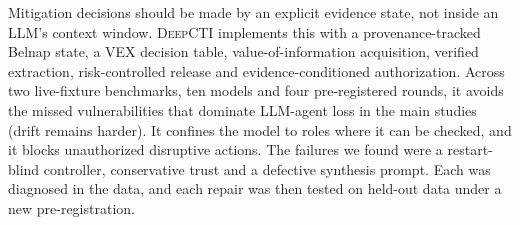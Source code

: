 \documentclass[conference]{IEEEtran}
\newcommand{\DC}{\textsc{DeepCTI}}
\begin{document}
Mitigation decisions should be made by an explicit evidence state, not inside an LLM's context window.
\DC{} implements this with a provenance-tracked Belnap state, a VEX decision table, value-of-information
acquisition, verified extraction, risk-controlled release and evidence-conditioned authorization.
Across two live-fixture benchmarks, ten models and four pre-registered rounds, it avoids the missed
vulnerabilities that dominate LLM-agent loss in the main studies (drift remains harder). It confines the model to roles where it can be checked,
and it blocks unauthorized disruptive actions. The failures we found were a restart-blind controller,
conservative trust and a defective synthesis prompt. Each was diagnosed in the data, and each repair
was then tested on held-out data under a new pre-registration.



\end{document}
